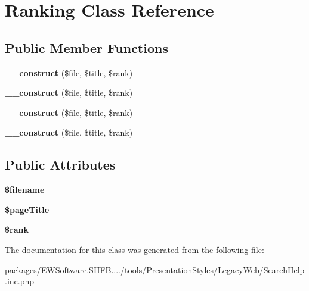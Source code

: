 \hypertarget{class_ranking}{}\section{Ranking Class Reference}
\label{class_ranking}
\subsection*{Public Member Functions}
\begin{DoxyCompactItemize}
\item 
{\bfseries \+\_\+\+\_\+construct} (\$file, \$title, \$rank)\hypertarget{class_ranking_afe0e442564f7e3a0adc2876114529875}{}\label{class_ranking_afe0e442564f7e3a0adc2876114529875}

\item 
{\bfseries \+\_\+\+\_\+construct} (\$file, \$title, \$rank)\hypertarget{class_ranking_afe0e442564f7e3a0adc2876114529875}{}\label{class_ranking_afe0e442564f7e3a0adc2876114529875}

\item 
{\bfseries \+\_\+\+\_\+construct} (\$file, \$title, \$rank)\hypertarget{class_ranking_afe0e442564f7e3a0adc2876114529875}{}\label{class_ranking_afe0e442564f7e3a0adc2876114529875}

\item 
{\bfseries \+\_\+\+\_\+construct} (\$file, \$title, \$rank)\hypertarget{class_ranking_afe0e442564f7e3a0adc2876114529875}{}\label{class_ranking_afe0e442564f7e3a0adc2876114529875}

\end{DoxyCompactItemize}
\subsection*{Public Attributes}
\begin{DoxyCompactItemize}
\item 
{\bfseries \$filename}\hypertarget{class_ranking_a1e4984ec7e4c36e708eb28b8be2391f7}{}\label{class_ranking_a1e4984ec7e4c36e708eb28b8be2391f7}

\item 
{\bfseries \$page\+Title}\hypertarget{class_ranking_a0056f5cd56d4064ff87ac7320cfb6015}{}\label{class_ranking_a0056f5cd56d4064ff87ac7320cfb6015}

\item 
{\bfseries \$rank}\hypertarget{class_ranking_ab5257619a8e402eb95339f60aff1376c}{}\label{class_ranking_ab5257619a8e402eb95339f60aff1376c}

\end{DoxyCompactItemize}


The documentation for this class was generated from the following file\+:\begin{DoxyCompactItemize}
\item 
packages/\+E\+W\+Software.\+S\+H\+F\+B..../tools/\+Presentation\+Styles/\+Legacy\+Web/Search\+Help.\+inc.\+php\end{DoxyCompactItemize}
